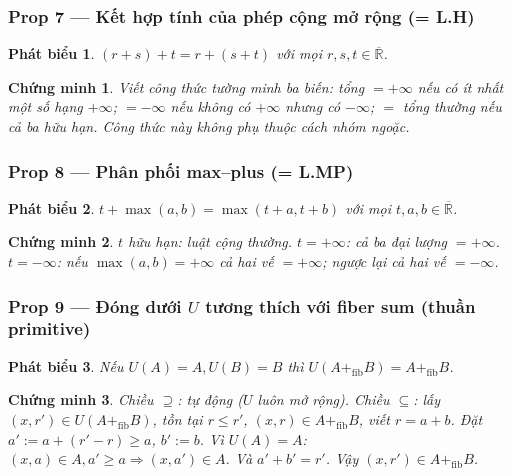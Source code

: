 \documentclass[11pt]{article}
\theoremstyle{plainlabel}
\newtheorem*{phatbieu}{Phát biểu}
\newtheorem*{chungminh}{Chứng minh}
\begin{document}
\subsubsection*{Prop 7 --- Kết hợp tính của phép cộng mở rộng (= L.H)}
\begin{phatbieu} $(r+s)+t=r+(s+t)$ với mọi $r,s,t\in\overline{\mathbb R}$. \end{phatbieu}
\begin{chungminh} Viết công thức tường minh ba biến: tổng $=+\infty$ nếu có ít nhất một số hạng $+\infty$; $=-\infty$ nếu không có $+\infty$ nhưng có $-\infty$; $=$ tổng thường nếu cả ba hữu hạn. Công thức này không phụ thuộc cách nhóm ngoặc. \end{chungminh}

\subsubsection*{Prop 8 --- Phân phối max--plus (= L.MP)}
\begin{phatbieu} $t+\max(a,b)=\max(t+a,t+b)$ với mọi $t,a,b\in\overline{\mathbb R}$. \end{phatbieu}
\begin{chungminh} $t$ hữu hạn: luật cộng thường. $t=+\infty$: cả ba đại lượng $=+\infty$. $t=-\infty$: nếu $\max(a,b)=+\infty$ cả hai vế $=+\infty$; ngược lại cả hai vế $=-\infty$. \end{chungminh}

\subsubsection*{Prop 9 --- Đóng dưới $U$ tương thích với fiber sum (thuần primitive)}
\begin{phatbieu} Nếu $U(A)=A,U(B)=B$ thì $U(A+_{\mathrm{fib}}B)=A+_{\mathrm{fib}}B$. \end{phatbieu}
\begin{chungminh} Chiều $\supseteq$: tự động ($U$ luôn mở rộng). Chiều $\subseteq$: lấy $(x,r')\in U(A+_{\mathrm{fib}}B)$, tồn tại $r\le r'$, $(x,r)\in A+_{\mathrm{fib}}B$, viết $r=a+b$. Đặt $a':=a+(r'-r)\ge a$, $b':=b$. Vì $U(A)=A$: $(x,a)\in A,a'\ge a\Rightarrow(x,a')\in A$. Và $a'+b'=r'$. Vậy $(x,r')\in A+_{\mathrm{fib}}B$. \end{chungminh}
\end{document}
